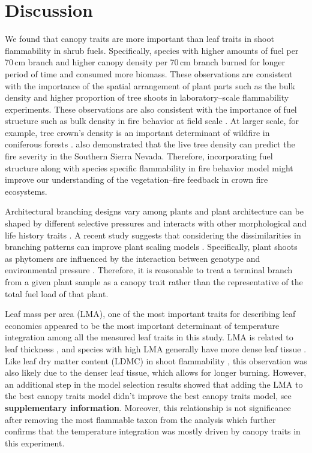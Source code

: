 \documentclass{bmcart}
\begin{document}
\section*{Discussion}
We found that canopy traits are more important than leaf traits in shoot flammability in shrub fuels. Specifically, species with higher amounts of fuel per 70\,cm branch and higher canopy density per 70\,cm branch burned for longer period of time and consumed more biomass. These observations are consistent with the importance of the spatial arrangement of plant parts such as the bulk density \citep{pausas2012firesulex} and higher proportion of tree shoots \citep{potts2022growth} in laboratory--scale flammability experiments. These observations are also consistent with the importance of fuel structure such as bulk density in fire behavior at field scale \citep{tumino2019plant}. At larger scale, for example, tree crown's density is an important determinant of wildfire in coniferous forests \citep{bond1996fire}. \citet{stephens2022mass} also demonstrated that the live tree density can predict the fire severity in the Southern Sierra Nevada. Therefore, incorporating fuel structure along with species specific flammability in fire behavior model might improve our understanding of the vegetation--fire feedback in crown fire ecosystems. 

Architectural branching designs vary among plants \citep{halle2012tropical} and plant architecture can be shaped by different selective pressures \citep{danell1994browseeffects, schwilk2003flammability} and interacts with other morphological and life history traits \citep{ackerly1998leaf, schwilk2001flammability, archibald2003growing}. A recent study suggests that considering the dissimilarities in branching patterns can improve plant scaling models \citep{bentley2013empirical}. Specifically, plant shoots as phytomers are influenced by the interaction between genotype and environmental pressure \citep{mcsteen2005shoot, wang2008molecular}. Therefore, it is reasonable to treat a terminal branch from a given plant sample as a canopy trait rather than the 
representative of the total fuel load of that plant.

Leaf mass per area (LMA), one of the most important traits for describing leaf economics \citep{wright2004worldwide} appeared to be the most important determinant of temperature integration among all the measured leaf traits in this study. LMA is related to leaf thickness \citep{niinemets1999research}, and species with high LMA generally have more dense leaf tissue \citep{poorter2009causes}. Like leaf dry matter content (LDMC) in shoot flammability \citep{alam2020shoot, potts2022growth}, this observation was also likely due to the denser leaf tissue, which allows for longer burning. However, an additional step in the model selection results showed that adding the LMA to the best canopy traits model didn't improve the best canopy traits model, see \textbf{supplementary information}. Moreover, this relationship is not significance after removing the most flammable taxon from the analysis which further confirms that the temperature integration was mostly driven by canopy traits in this experiment.
\end{document}
